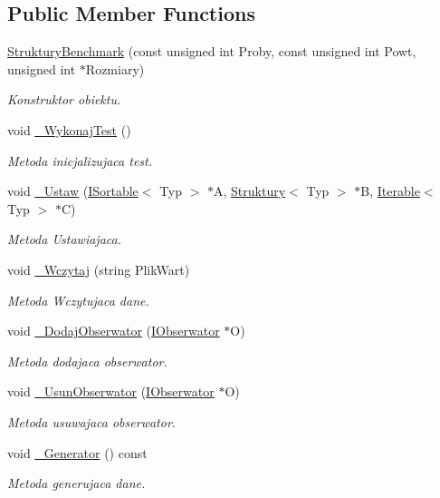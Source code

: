 \subsection*{Public Member Functions}
\begin{DoxyCompactItemize}
\item 
\hyperlink{class_struktury_benchmark_a7fee46e82c9b608cf799855f1013b9f8}{Struktury\-Benchmark} (const unsigned int Proby, const unsigned int Powt, unsigned int $\ast$Rozmiary)
\begin{DoxyCompactList}\small\item\em Konstruktor obiektu. \end{DoxyCompactList}\item 
void \hyperlink{class_struktury_benchmark_a1eae568d916544c7ceb7a8ec071b17ff}{\-\_\-\-Wykonaj\-Test} ()
\begin{DoxyCompactList}\small\item\em Metoda inicjalizujaca test. \end{DoxyCompactList}\item 
void \hyperlink{class_struktury_benchmark_a92c72eeea5ac0da73a6f9f186a583294}{\-\_\-\-Ustaw} (\hyperlink{class_i_sortable}{I\-Sortable}$<$ Typ $>$ $\ast$A, \hyperlink{class_struktury}{Struktury}$<$ Typ $>$ $\ast$B, \hyperlink{class_iterable}{Iterable}$<$ Typ $>$ $\ast$C)
\begin{DoxyCompactList}\small\item\em Metoda Ustawiajaca. \end{DoxyCompactList}\item 
void \hyperlink{class_struktury_benchmark_a949e7eef56ff1dce1be1afac5fccc306}{\-\_\-\-Wczytaj} (string Plik\-Wart)
\begin{DoxyCompactList}\small\item\em Metoda Wczytujaca dane. \end{DoxyCompactList}\item 
void \hyperlink{class_struktury_benchmark_a63247cc5616565e429f5abd09d887630}{\-\_\-\-Dodaj\-Obserwator} (\hyperlink{class_i_obserwator}{I\-Obserwator} $\ast$O)
\begin{DoxyCompactList}\small\item\em Metoda dodajaca obserwator. \end{DoxyCompactList}\item 
void \hyperlink{class_struktury_benchmark_af08fe671ed7528428ffcb8a4daf65197}{\-\_\-\-Usun\-Obserwator} (\hyperlink{class_i_obserwator}{I\-Obserwator} $\ast$O)
\begin{DoxyCompactList}\small\item\em Metoda usuwajaca obserwator. \end{DoxyCompactList}\item 
void \hyperlink{class_struktury_benchmark_aa5a6c92b86be3cd99177322c92329164}{\-\_\-\-Generator} () const 
\begin{DoxyCompactList}\small\item\em Metoda generujaca dane. \end{DoxyCompactList}\end{DoxyCompactItemize}
